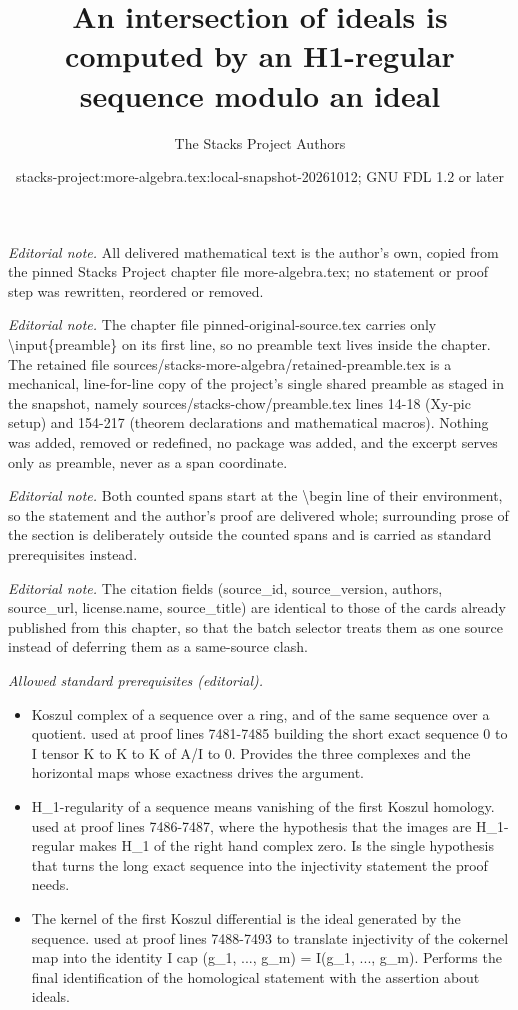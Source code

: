 \documentclass[10pt,a4paper]{amsart}
\title{An intersection of ideals is computed by an H1-regular sequence modulo an ideal}
\author{The Stacks Project Authors}
\date{stacks-project:more-algebra.tex:local-snapshot-20261012; GNU FDL 1.2 or later}
\theoremstyle{plain}
\theoremstyle{definition}
\theoremstyle{remark}
\numberwithin{equation}{subsection}
\begin{document}
\maketitle
\setcounter{subsection}{1}
\noindent\textit{Editorial note.} All delivered mathematical text is the author's own, copied from the pinned Stacks Project chapter file more-algebra.tex; no statement or proof step was rewritten, reordered or removed.\par\medskip
\noindent\textit{Editorial note.} The chapter file pinned-original-source.tex carries only \textbackslash{}input\{preamble\} on its first line, so no preamble text lives inside the chapter. The retained file sources/stacks-more-algebra/retained-preamble.tex is a mechanical, line-for-line copy of the project's single shared preamble as staged in the snapshot, namely sources/stacks-chow/preamble.tex lines 14-18 (Xy-pic setup) and 154-217 (theorem declarations and mathematical macros). Nothing was added, removed or redefined, no package was added, and the excerpt serves only as preamble, never as a span coordinate.\par\medskip
\noindent\textit{Editorial note.} Both counted spans start at the \textbackslash{}begin line of their environment, so the statement and the author's proof are delivered whole; surrounding prose of the section is deliberately outside the counted spans and is carried as standard prerequisites instead.\par\medskip
\noindent\textit{Editorial note.} The citation fields (source\_id, source\_version, authors, source\_url, license.name, source\_title) are identical to those of the cards already published from this chapter, so that the batch selector treats them as one source instead of deferring them as a same-source clash.\par\medskip
\noindent\textit{Allowed standard prerequisites (editorial).}\begin{itemize}
\item Koszul complex of a sequence over a ring, and of the same sequence over a quotient. used at proof lines 7481-7485 building the short exact sequence 0 to I tensor K to K to K of A/I to 0. Provides the three complexes and the horizontal maps whose exactness drives the argument.
\item H\_1-regularity of a sequence means vanishing of the first Koszul homology. used at proof lines 7486-7487, where the hypothesis that the images are H\_1-regular makes H\_1 of the right hand complex zero. Is the single hypothesis that turns the long exact sequence into the injectivity statement the proof needs.
\item The kernel of the first Koszul differential is the ideal generated by the sequence. used at proof lines 7488-7493 to translate injectivity of the cokernel map into the identity I cap (g\_1, ..., g\_m) = I(g\_1, ..., g\_m). Performs the final identification of the homological statement with the assertion about ideals.
\end{itemize}\medskip
\end{document}

